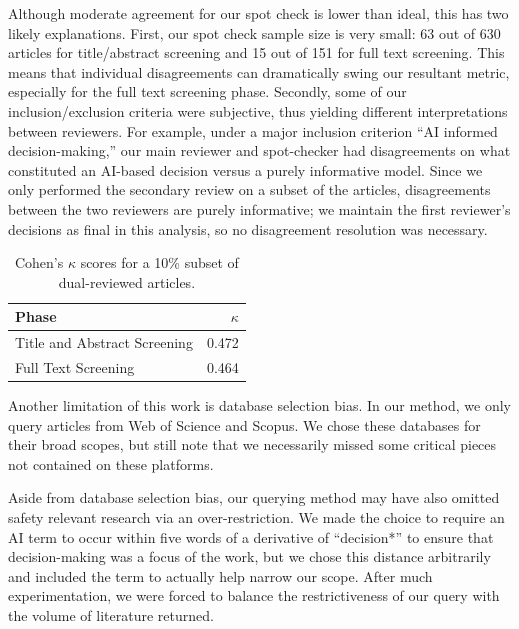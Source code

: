 \documentclass[authoryear,preprint,12pt]{elsarticle}
\begin{document}
Although moderate agreement for our spot check is lower than ideal, this has two
likely explanations. First, our spot check sample size is very small: 63 out of
630 articles for title/abstract screening and 15 out of 151 for full text
screening. This means that individual disagreements can dramatically swing our
resultant metric, especially for the full text screening phase. Secondly, some
of our inclusion/exclusion criteria were subjective, thus yielding different
interpretations between reviewers. For example, under a major inclusion
criterion ``AI informed decision-making,'' our main reviewer and spot-checker
had disagreements on what constituted an AI-based decision versus a purely
informative model. Since we only performed the secondary review on a subset of
the articles, disagreements between the two reviewers are purely informative; we
maintain the first reviewer's decisions as final in this analysis, so no
disagreement resolution was necessary.

\begin{table}
    \centering
    \caption{Cohen's $\kappa$ scores for a 10\% subset of dual-reviewed articles.}
    \label{tab:inter-rater-agreement}
    \begin{tabular}{lr}
        \toprule
        Phase & $\kappa$ \\
        \midrule
        Title and Abstract Screening & 0.472 \\
        Full Text Screening & 0.464 \\
        \bottomrule
    \end{tabular}
\end{table}

Another limitation of this work is database selection bias. In our method, we
only query articles from Web of Science and Scopus. We chose these databases for
their broad scopes, but still note that we necessarily missed some critical
pieces not contained on these platforms. 

Aside from database selection bias, our querying method may have also omitted
safety relevant research via an over-restriction. We made the choice to require
an AI term to occur within five words of a derivative of ``decision*'' to ensure
that decision-making was a focus of the work, but we chose this distance
arbitrarily and included the term to actually help narrow our scope. After much
experimentation, we were forced to balance the restrictiveness of our query with
the volume of literature returned.
\end{document}
